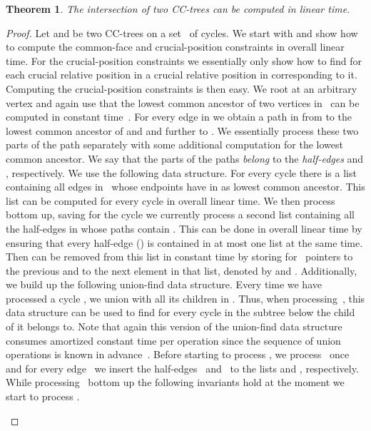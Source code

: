 \documentclass{scrartcl}
\newcommand{\1}[1]{{\normalfont \ensuremath{#1^{\tiny\circled{1}}}}} \newcommand{\2}[1]{{\normalfont \ensuremath{#1^{\tiny\circled{2}}}}} \renewcommand{\k}[1]{{\normalfont \ensuremath{#1^{\tiny\circled{k}}}}} \newcommand{\proj}[2]{\ensuremath{\left.#1\right|_{#2}}} \newcommand{\eps}{\varepsilon}
\theoremstyle{plain} \newtheorem{theorem}{Theorem} \newcounter{lemmacounter} \setcounter{lemmacounter}{0} \newtheorem{lemma}[lemmacounter]{Lemma} \newtheorem{fact}{Fact}  \newtheorem{corollary}{Corollary} \theoremstyle{definition} \newtheorem{definition}{Definition}
\begin{document}
\begin{theorem}
  \label{thm:intersection-in-lin-time}
  The intersection of two CC-trees can be computed in linear time.
\end{theorem}
\begin{proof}
  Let  and 
  be two CC-trees on a set~ of cycles.  We start with
   and show how
  to compute the common-face and crucial-position constraints in
  overall linear time.  For the crucial-position constraints we
  essentially only show how to find for each crucial relative position
  in  a crucial relative position in
   corresponding to it.  Computing the
  crucial-position constraints is then easy.  We root  at an arbitrary vertex and again use that the lowest
  common ancestor of two vertices in~ can be
  computed in constant time~\cite{ht-fafnca-84, bf-lcapr-00}.  For
  every edge  in  we
  obtain a path in  from  to the lowest
  common ancestor of  and  and further to .  We
  essentially process these two parts of the path separately with some
  additional computation for the lowest common ancestor.  We say that
  the parts of the paths \emph{belong} to the \emph{half-edges}
   and , respectively.  We use the following
  data structure.  For every cycle  there is a list 
  containing all edges in~ whose
  endpoints have  in  as lowest common
  ancestor.  This list can be computed for every cycle in overall
  linear time.  We then process  bottom up,
  saving for the cycle  we currently process a second list
   containing all the half-edges in  whose paths contain .  This can be done in overall
  linear time by ensuring that every half-edge  ()
  is contained in at most one list  at the same time.  Then
   can be removed from this list in constant time by storing
  for~ pointers to the previous and to the next element in
  that list, denoted by  and .
  Additionally, we build up the following union-find data structure.
  Every time we have processed a cycle , we union  with all its
  children in .  Thus, when processing~,
  this data structure can be used to find for every cycle in the
  subtree below  the child of  it belongs to.  Note that again
  this version of the union-find data structure consumes amortized
  constant time per operation since the sequence of union operations
  is known in advance~\cite{gt-ltascdsu-85}.  Before starting to
  process , we process~ once and for every edge~ we
  insert the half-edges~ and~ to the lists
   and , respectively.  While
  processing~ bottom up the following
  invariants hold at the moment we start to process .
  \begin{compactenum}

\end{compactenum}
\end{proof}
\end{document}
